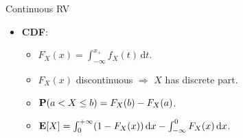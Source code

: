 \documentclass[landscape,a4paper]{article}
\begin{document}
\begin{cheatsheetcolumns}
\begin{card}{Continuous RV}
\begin{itemize}
\begin{itemize}
\begin{itemize}
						\item $\var[X]=(b-a)^2/12$.
					\end{itemize}
					\item \textbf{Exponential RV}:
					\begin{itemize}
						\item $f_X(x)=\lambda\e^{-\lambda x},x\ge 0$,
						\item $F_X(x)=1-\e^{-\lambda x},x\ge 0$.
						\item $\EE[X]=1/\lambda$,
						\item $\EE[X^2]=2/\lambda^2$,
						\item $\var[X]=1/\lambda^2$.
						\item $\PP(X_1<X_2)=\lambda_1/(\lambda_1+\lambda_2)$.
						\item Memorylessness:\\
						$f_X(x|X>a)=\lambda \e^{-\lambda(x-a)}, \PP(X\ge c+x|X\ge c)=\PP(X\ge x)=\e^{-\lambda x};$\\$\EE[X|X>c]=1/\lambda+c$.
					\end{itemize}
					\item \textbf{Gaussian RV} ($X\sim N(\mu,\sigma^2)$):
					\begin{itemize}
						\item \[f_X(x)=\frac{1}{\sigma\sqrt{2\uppi}}\e^{-(x-\mu)^2/(2\sigma^2)},\]
						\item $F_\Lambda(\lambda)=\varPhi(\lambda),\Lambda\sim N(0,1)$.
						\item $\EE[X]=\mu$,
						\item $\EE[X^2]=\mu^2+\sigma^2$,
						\item $\EE[X^4]=3\sigma^4+6\sigma^2\mu^2+\mu^4$,
						\item $\var[X]=\sigma^2$.
						\item $Y=\alpha X+\beta\sim N(\alpha\mu+\beta,\alpha^2\sigma^2)$.
					\end{itemize}
				\end{itemize}
				\item \textbf{CDF}:\begin{itemize}
					\item $F_X(x)=\int_{-\infty}^{x_+} f_X(t)\,\mathrm dt$.
					\item $F_X(x)$ discontinuous $\Rightarrow$ $X$ has discrete part.
					\item $\mathbf{P}(a<X\le b)=F_X(b)-F_X(a)$.
					\item $\mathbf{E}[X]=\int_0^{+\infty}(1-F_X(x))\,\mathrm dx-\int_{-\infty}^0F_X(x)\,\mathrm dx$.
				\end{itemize}

\end{itemize}
\end{card}
\end{cheatsheetcolumns}
\end{document}
